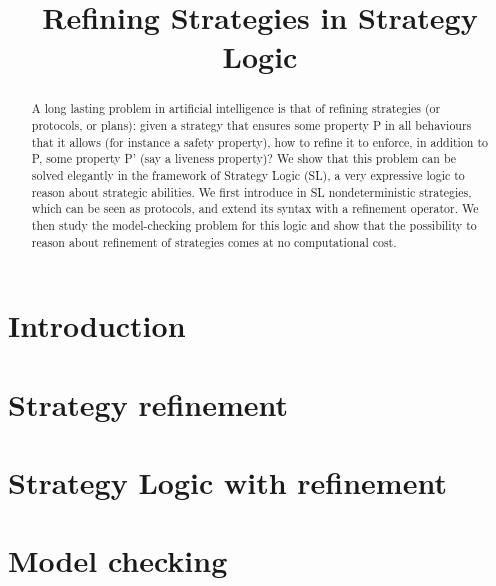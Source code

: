 \documentclass{article}
\title{Refining Strategies in Strategy Logic}
\author{
%
%
%
}
\theoremstyle{definition}
\theoremstyle{plain}
\begin{document}
\maketitle

\begin{abstract}
  A long lasting problem in artificial intelligence is that of
  refining strategies (or protocols, or plans): given a strategy that
  ensures some
  property P in all behaviours that it allows (for instance a safety
  property), how to refine it to enforce, in addition to P, some
  property P' (say a liveness property)? We show that this problem can
  be solved elegantly in the framework of Strategy Logic (SL), a very
  expressive logic to reason about strategic abilities. We first
  introduce in SL nondeterministic strategies, which can be seen as
  protocols, and extend its syntax with a refinement operator. We then
  study the model-checking problem for this logic and show that the
  possibility to reason about refinement of strategies comes at no
  computational cost.
\end{abstract}

\section{Introduction}
\label{section:introduction}


\section{Strategy refinement}
\label{section:refinement}

\section{Strategy Logic with refinement}
\label{section:SL}


\section{Model checking \SLref}
\label{section:mc}




\end{document}
